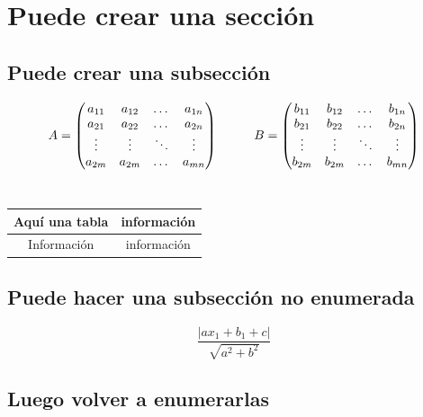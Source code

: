 \documentclass[a4paper,openright,11pt]{book}
\begin{document}

    \section{Puede crear una sección}
    \subsection{Puede crear una subsección}
        
        $$A=\begin{pmatrix} 
         a_{11}& a_{12} & \dotsc & a_{1n}\\ 
         a_{21}& a_{22} & \dotsc & a_{2n}\\
         \vdots & \vdots & \ddots&  \vdots\\
          a_{2m}& a_{2m} & \dotsc & a_{mn}
        \end{pmatrix} \hspace{1 cm} B=\begin{pmatrix} 
         b_{11}& b_{12} & \dotsc & b_{1n}\\ 
         b_{21}& b_{22} & \dotsc & b_{2n}\\
         \vdots & \vdots & \ddots&  \vdots\\
          b_{2m}& b_{2m} & \dotsc & b_{mn}
        \end{pmatrix} $$ \\
      
        \begin{center}
            \begin{tabular}{|c|c|}
               \hline Aquí una tabla & información \\ \hline
                      Información & información \\ \hline
            \end{tabular}
        \end{center}
        

        \subsection*{Puede hacer una subsección no enumerada}

        \begin{equation}
            \frac{|ax_1+b_1+c|}{\sqrt{a^2+b^2}}
        \end{equation}

        \subsection{Luego volver a enumerarlas}
\end{document}
